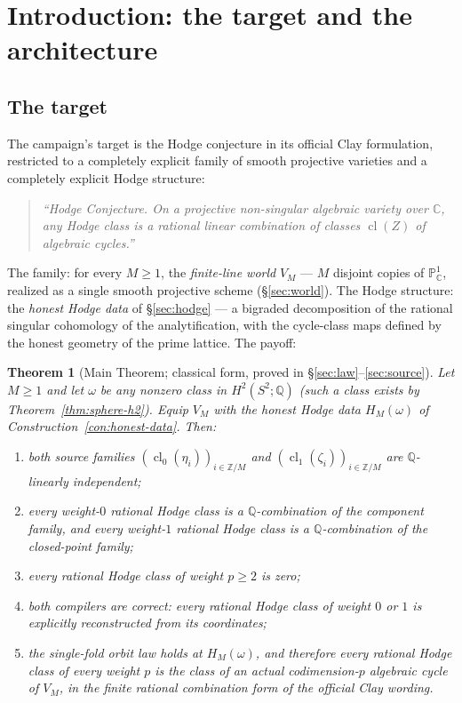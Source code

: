 \documentclass[11pt,a4paper]{article}
\theoremstyle{plain}
\newtheorem{theorem}{Theorem}[section]
\theoremstyle{definition}
\newcommand{\Z}{\mathbb{Z}}
\newcommand{\Q}{\mathbb{Q}}
\newcommand{\C}{\mathbb{C}}
\newcommand{\PP}{\mathbb{P}}
\newcommand{\cl}{\operatorname{cl}}
\begin{document}
\section{Introduction: the target and the architecture}\label{sec:intro}

\subsection{The target}

The campaign's target is the Hodge conjecture in its official Clay
formulation, restricted to a completely explicit family of smooth
projective varieties and a completely explicit Hodge structure:

\begin{quote}
\textit{``Hodge Conjecture. On a projective non-singular algebraic
variety over $\C$, any Hodge class is a rational linear combination of
classes $\cl(Z)$ of algebraic cycles.''}
\end{quote}

The family: for every $M \ge 1$, the \emph{finite-line world} $V_M$ ---
$M$ disjoint copies of $\PP^1_\C$, realized as a single smooth projective
scheme (\S\ref{sec:world}).  The Hodge structure: the \emph{honest Hodge
data} of \S\ref{sec:hodge} --- a bigraded decomposition of the rational
singular cohomology of the analytification, with the cycle-class maps
defined by the honest geometry of the prime lattice.  The payoff:

\begin{theorem}[Main Theorem; classical form, proved in
\S\ref{sec:law}--\ref{sec:source}]\label{thm:main}
Let $M \ge 1$ and let $\omega$ be any nonzero class in
$H^2(S^2;\Q)$ (such a class exists by Theorem~\ref{thm:sphere-h2}).
Equip $V_M$ with the honest Hodge data
$H_M(\omega)$ of Construction~\ref{con:honest-data}.  Then:
\begin{enumerate}
\item both source families $(\cl_0(\eta_i))_{i \in \Z/M}$ and
$(\cl_1(\zeta_i))_{i \in \Z/M}$ are $\Q$-linearly independent;
\item every weight-$0$ rational Hodge class is a $\Q$-combination of
the component family, and every weight-$1$ rational Hodge class is a
$\Q$-combination of the closed-point family;
\item every rational Hodge class of weight $p \ge 2$ is zero;
\item both compilers are correct: every rational Hodge class of weight
$0$ or $1$ is \emph{explicitly} reconstructed from its coordinates;
\item the single-fold orbit law holds at $H_M(\omega)$, and therefore
\emph{every rational Hodge class of every weight $p$ is the class of an
actual codimension-$p$ algebraic cycle of $V_M$}, in the finite rational
combination form of the official Clay wording.
\end{enumerate}
\end{theorem}
\end{document}
